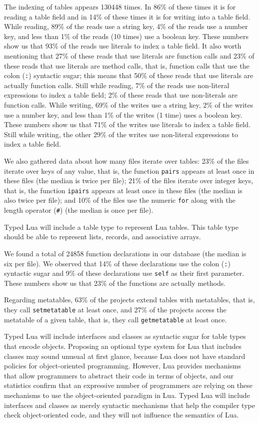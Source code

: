 \documentclass[preprint]{sig-alternate}
\begin{document}
The indexing of tables appears 130448 times.
In 86\% of these times it is for reading a table field and
in 14\% of these times it is for writing into a table field.
While reading, 89\% of the reads use a string key,
4\% of the reads use a number key,
and less than 1\% of the reads (10 times) use a boolean key.
These numbers show us that 93\% of the reads use literals to index
a table field.
It also worth mentioning that 27\% of these reads that use literals
are function calls and 23\% of these reads that use literals are
method calls, that is, function calls that use the colon (\verb':')
syntactic sugar;
this means that 50\% of these reads that use literals are actually
function calls.
Still while reading, 7\% of the reads use non-literal
expressions to index a table field; 2\% of these reads that
use non-literals are function calls.
While writing, 69\% of the writes use a string key,
2\% of the writes use a number key,
and less than 1\% of the writes (1 time) uses a boolean key.
These numbers show us that 71\% of the writes use literals to index
a table field.
Still while writing, the other 29\% of the writes use non-literal
expressions to index a table field.

We also gathered data about how many files iterate over tables:
23\% of the files iterate over keys of any value, that is,
the function \verb'pairs' appears at least once in these files
(the median is twice per file);
21\% of the files iterate over integer keys, that is,
the function \verb'ipairs' appears at least once in these files
(the median is also twice per file);
and 10\% of the files use the numeric \verb'for' along with the length
operator (\verb'#') (the median is once per file).

Typed Lua will include a table type to represent Lua tables.
This table type should be able to represent lists, records,
and associative arrays.

We found a total of 24858 function declarations in our database
(the median is six per file).
We observed that 14\% of these declarations use the colon
(\verb':') syntactic sugar and 9\% of these declarations use
\verb'self' as their first parameter.
These numbers show us that 23\% of the functions are actually methods.

Regarding metatables, 63\% of the projects extend tables with
metatables, that is, they call \verb'setmetatable' at least once,
and 27\% of the projects access the metatable of a given table,
that is, they call \verb'getmetatable' at least once.

Typed Lua will include interfaces and classes as syntactic sugar
for table types that encode objects.
Proposing an optional type system for Lua that includes classes may
sound unusual at first glance, because Lua does not have standard
policies for object-oriented programming.
However, Lua provides mechanisms that allow programmers to abstract
their code in terms of objects, and our statistics confirm that
an expressive number of programmers are relying on these mechanisms to
use the object-oriented paradigm in Lua.
Typed Lua will include interfaces and classes as merely syntactic
mechanisms that help the compiler type check object-oriented code,
and they will not influence the semantics of Lua.
\end{document}
